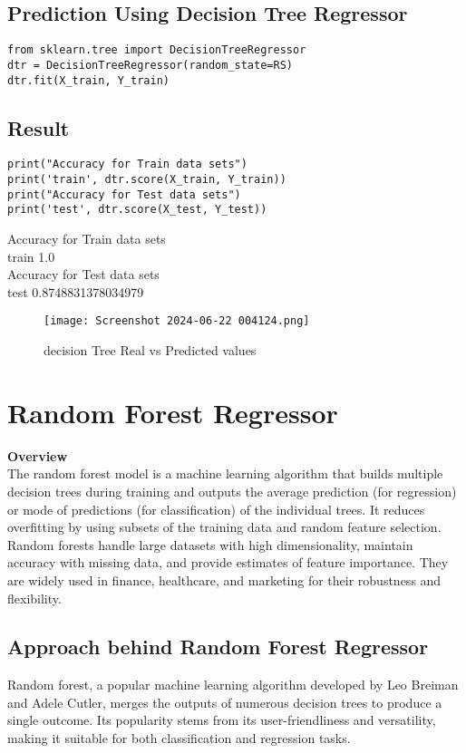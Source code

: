 \documentclass[12pt,a4paper]{report}
\begin{document}
\subsection{Prediction Using Decision Tree Regressor}
\begin{lstlisting}
from sklearn.tree import DecisionTreeRegressor
dtr = DecisionTreeRegressor(random_state=RS)
dtr.fit(X_train, Y_train)
\end{lstlisting}
\subsection{Result}
\begin{lstlisting}
print("Accuracy for Train data sets")
print('train', dtr.score(X_train, Y_train))
print("Accuracy for Test data sets")
print('test', dtr.score(X_test, Y_test))
\end{lstlisting}
Accuracy for Train data sets\\
train 1.0\\
Accuracy for Test data sets\\
test 0.8748831378034979
\begin{figure} [!ht]
    \centering
    \texttt{[image: Screenshot 2024-06-22 004124.png]}
    \caption{decision Tree Real vs Predicted values}
    \label{fig:enter-label}
\end{figure}
\section{Random Forest Regressor}
\textbf{Overview}\\
The random forest model is a machine learning algorithm that builds multiple decision trees during training and outputs the average prediction (for regression) or mode of predictions (for classification) of the individual trees. It reduces overfitting by using subsets of the training data and random feature selection. Random forests handle large datasets with high dimensionality, maintain accuracy with missing data, and provide estimates of feature importance. They are widely used in finance, healthcare, and marketing for their robustness and flexibility.
\subsection{Approach behind Random Forest Regressor}
Random forest, a popular machine learning algorithm developed by Leo Breiman and Adele Cutler, merges the outputs of numerous decision trees to produce a single outcome. Its popularity stems from its user-friendliness and versatility, making it suitable for both classification and regression tasks.
\end{document}
